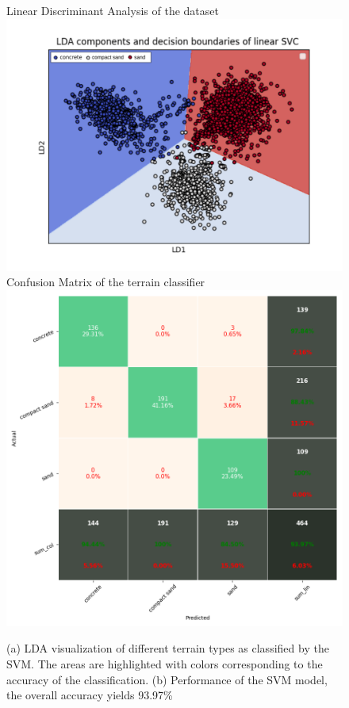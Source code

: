 \begin{figure}[!htb]
    \centering
    \subcaptionbox
        {Linear Discriminant Analysis of the dataset}
        {\includegraphics[width=\columnwidth]{../figures/boundary_LDA_prevTesting_all_sand_concrete_compactsand.png}}
    \subcaptionbox
        {Confusion Matrix of the terrain classifier}
        {\includegraphics[width=\columnwidth]{../figures/confusionmatrix_Train.png}}
    \caption{(a) LDA visualization of different terrain types as classified by the SVM. The areas are highlighted with colors corresponding to the accuracy of the classification. (b) Performance of the SVM model, the overall accuracy yields 93.97\% }
    \label{fig:offline-class}
\end{figure}

